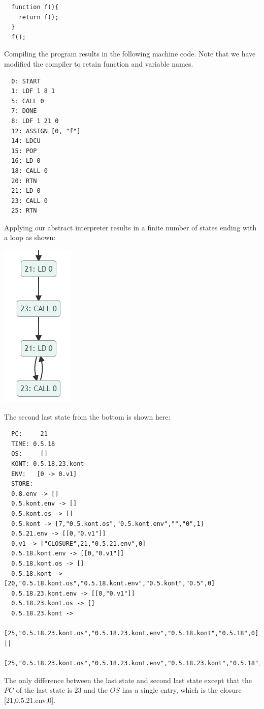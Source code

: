 \documentclass[12pt]{article}
\begin{document}
\begin{verbatim}
  function f(){
    return f();
  }
  f();
\end{verbatim}
Compiling the program results in the following machine code. Note that we have modified the compiler to retain function and variable names.

\begin{verbatim}
  0: START
  1: LDF 1 8 1
  5: CALL 0
  7: DONE
  8: LDF 1 21 0
  12: ASSIGN [0, "f"]
  14: LDCU
  15: POP
  16: LD 0
  18: CALL 0
  20: RTN
  21: LD 0
  23: CALL 0
  25: RTN
\end{verbatim}
Applying our abstract interpreter results in a finite number of states ending with a loop as shown:
\begin{center}
  \includegraphics[scale=0.7]{simple_graph.png}
\end{center}
The second last state from the bottom is shown here:
\begin{verbatim}
  PC:	  21
  TIME:	0.5.18
  OS:	  []
  KONT:	0.5.18.23.kont
  ENV:	 [0 -> 0.v1]
  STORE:
  0.8.env -> []
  0.5.kont.env -> []
  0.5.kont.os -> []
  0.5.kont -> [7,"0.5.kont.os","0.5.kont.env","","0",1]
  0.5.21.env -> [[0,"0.v1"]]
  0.v1 -> ["CLOSURE",21,"0.5.21.env",0]
  0.5.18.kont.env -> [[0,"0.v1"]]
  0.5.18.kont.os -> []
  0.5.18.kont -> [20,"0.5.18.kont.os","0.5.18.kont.env","0.5.kont","0.5",0]
  0.5.18.23.kont.env -> [[0,"0.v1"]]
  0.5.18.23.kont.os -> []
  0.5.18.23.kont -> 
   [25,"0.5.18.23.kont.os","0.5.18.23.kont.env","0.5.18.kont","0.5.18",0] ||
   [25,"0.5.18.23.kont.os","0.5.18.23.kont.env","0.5.18.23.kont","0.5.18",0]
  \end{verbatim}
The only difference between the last state and second last state except that the $PC$ of the last state is 23 and the $OS$ has a single entry, which is the closure [21,0.5.21.env,0]. 





\end{document}
